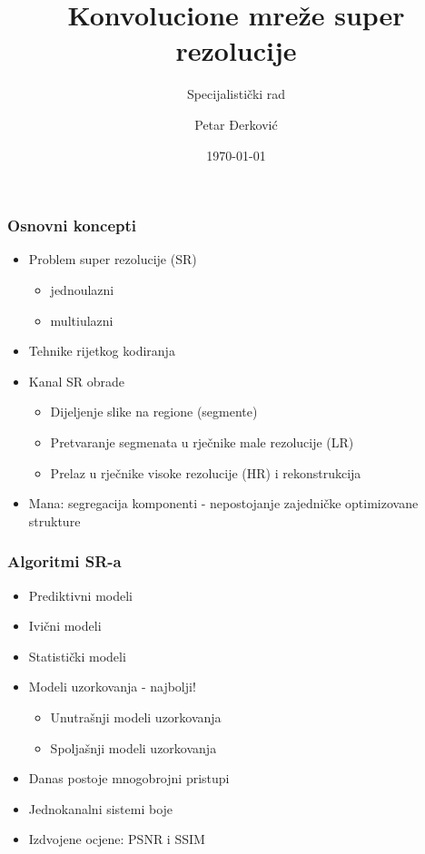 \documentclass{beamer}
\title{Konvolucione mreže super rezolucije}
\subtitle{Specijalistički rad}
\author{Petar Đerković}
\institute{Prirodno-matematički fakultet, Podgorica}
\date{\today}
\begin{document}
\begin{frame}
\titlepage
\end{frame}


\begin{frame}
\frametitle{Osnovni koncepti}
  
\begin{itemize}
\item Problem super rezolucije (SR)
\begin{itemize}
\item jednoulazni \checkmark
\item multiulazni
\end{itemize}
\item Tehnike rijetkog kodiranja
\item Kanal SR obrade
\begin{itemize}
\item Dijeljenje slike na regione (segmente)
\item Pretvaranje segmenata u rječnike male rezolucije (LR)
\item Prelaz u rječnike visoke rezolucije (HR) i rekonstrukcija
\end{itemize}
\item Mana: segregacija komponenti - nepostojanje zajedničke optimizovane strukture
\end{itemize}
\end{frame}


\begin{frame}
\frametitle{Algoritmi SR-a}
  
\begin{itemize}
\item Prediktivni modeli
\item Ivični modeli
\item Statistički modeli
\item Modeli uzorkovanja - najbolji!
\begin{itemize}
\item Unutrašnji modeli uzorkovanja
\item Spoljašnji modeli uzorkovanja
\end{itemize}
\item Danas postoje mnogobrojni pristupi
\item Jednokanalni sistemi boje
\item Izdvojene ocjene: PSNR i SSIM
\end{itemize}
\end{frame}
\end{document}
